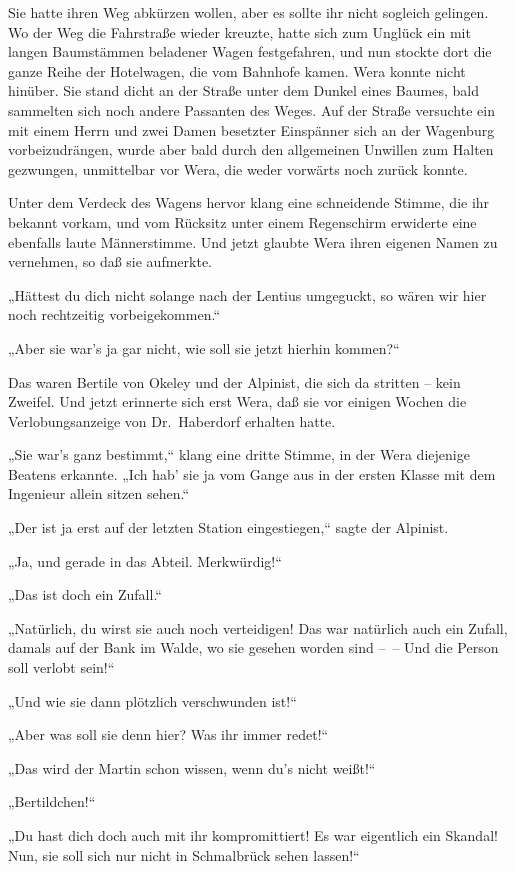 Sie hatte ihren Weg abkürzen wollen, aber es sollte ihr nicht
sogleich gelingen. Wo der Weg die Fahrstraße wieder kreuzte, hatte
sich zum Unglück ein mit langen Baumstämmen beladener Wagen
festgefahren, und nun stockte dort die ganze Reihe der Hotelwagen,
die vom Bahnhofe kamen. Wera konnte nicht hinüber. Sie stand dicht
an der Straße unter dem Dunkel eines Baumes, bald sammelten sich
noch andere Passanten des Weges. Auf der Straße versuchte ein mit
einem Herrn und zwei Damen besetzter Einspänner sich an der
Wagenburg vorbeizudrängen, wurde aber bald durch den allgemeinen
Unwillen zum Halten gezwungen, unmittelbar vor Wera, die weder
vorwärts noch zurück konnte.

Unter dem Verdeck des Wagens hervor klang eine schneidende Stimme,
die ihr bekannt vorkam, und vom Rücksitz unter einem Regenschirm
erwiderte eine ebenfalls laute Männerstimme. Und jetzt glaubte Wera
ihren eigenen Namen zu vernehmen, so daß sie aufmerkte.

„Hättest du dich nicht solange nach der Lentius umgeguckt, so wären
wir hier noch rechtzeitig vorbeigekommen.“

„Aber sie war's ja gar nicht, wie soll sie jetzt hierhin kommen?“

Das waren Bertile von Okeley und der Alpinist, die sich da stritten
– kein Zweifel. Und jetzt erinnerte sich erst Wera, daß sie vor
einigen Wochen die Verlobungsanzeige von Dr.~Haberdorf erhalten
hatte.

„Sie war's ganz bestimmt,“ klang eine dritte Stimme, in der Wera
diejenige Beatens erkannte. „Ich hab' sie ja vom Gange aus in der
ersten Klasse mit dem Ingenieur allein sitzen sehen.“

„Der ist ja erst auf der letzten Station eingestiegen,“ sagte der
Alpinist.

„Ja, und gerade in das Abteil. Merkwürdig!“

„Das ist doch ein Zufall.“

„Natürlich, du wirst sie auch noch verteidigen! Das war natürlich
auch ein Zufall, damals auf der Bank im Walde, wo sie gesehen
worden sind –~– Und die Person soll verlobt sein!“

„Und wie sie dann plötzlich verschwunden ist!“

„Aber was soll sie denn hier? Was ihr immer redet!“

„Das wird der Martin schon wissen, wenn du's nicht weißt!“

„Bertildchen!“

„Du hast dich doch auch mit ihr kompromittiert! Es war eigentlich
ein Skandal! Nun, sie soll sich nur nicht in Schmalbrück sehen
lassen!“


